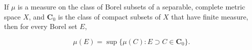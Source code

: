 If $\mu$ is a measure on the class of Borel subsets of a separable, complete metric space $X$, and $\mathbf{C}_0$ is the class of compact subsets of $X$ that have finite measure, then for every Borel set $E$,

$$\mu(E) = \sup \{ \mu(C): E \supset C \in \mathbf{C}_0 \}.$$
